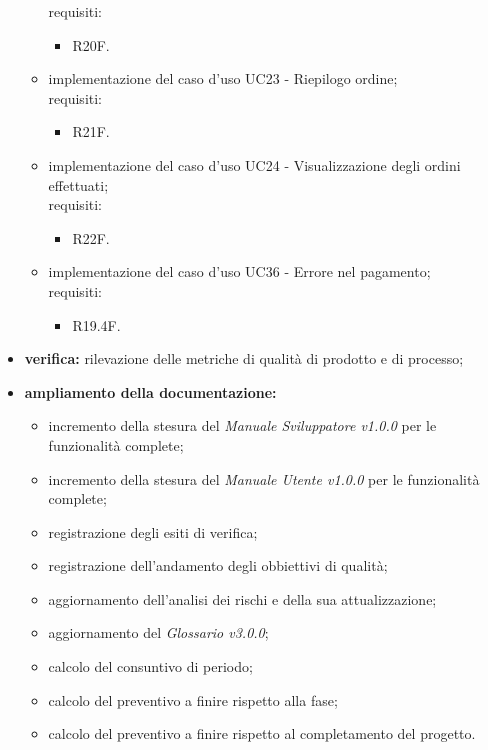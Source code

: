 \begin{itemize}
\begin{itemize}
                    requisiti:
                    \begin{itemize}
                        \item R20F.
                    \end{itemize}
              \item implementazione del caso d'uso UC23 -  Riepilogo ordine;\\
                    requisiti:
                    \begin{itemize}
                        \item R21F.
                    \end{itemize}
              \item implementazione del caso d'uso UC24 - Visualizzazione degli ordini effettuati;\\
                    requisiti:
                    \begin{itemize}
                        \item R22F.
                    \end{itemize}
              \item implementazione del caso d'uso UC36 -  Errore nel pagamento;\\
                    requisiti:
                    \begin{itemize}
                        \item R19.4F.
                    \end{itemize}
          \end{itemize}
    \item \textbf{verifica:} rilevazione delle metriche di qualità di prodotto e di processo;
    \item \textbf{ampliamento della documentazione:}
          \begin{itemize}
              \item incremento della stesura del \textit{Manuale Sviluppatore v1.0.0} per le funzionalità complete;
              \item incremento della stesura del \textit{Manuale Utente v1.0.0} per le funzionalità complete;
              \item registrazione degli esiti di verifica;
              \item registrazione dell'andamento degli obbiettivi di qualità;
              \item aggiornamento dell'analisi dei rischi e della sua attualizzazione;
              \item aggiornamento del \textit{Glossario v3.0.0};
              \item calcolo del consuntivo di periodo;
              \item calcolo del preventivo a finire rispetto alla fase;
              \item calcolo del preventivo a finire rispetto al completamento del progetto.
          \end{itemize}
\end{itemize}
